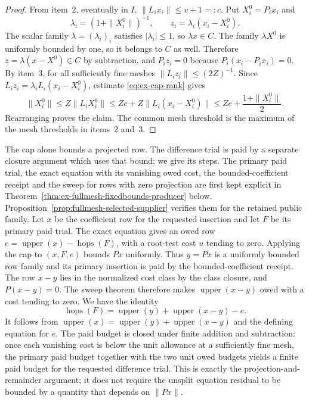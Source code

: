 \begin{proof}
From item~2, eventually in $I$, $\|L_i x_i\|\le v+1=:c$. Put
$X_i^0=P_i x_i$ and
\[
       \lambda_i=(1+\|X_i^0\|)^{-1},\qquad
       z_i=\lambda_i(x_i-X_i^0).
\]
The scalar family $\lambda=(\lambda_i)_i$ satisfies $|\lambda_i|\le1$, so
$\lambda x\in C$. The family $\lambda X^0$ is uniformly bounded by one, so
it belongs to $C$ as well. Therefore $z=\lambda(x-X^0)\in C$ by subtraction,
and $P_i z_i=0$ because
$P_i(x_i-P_ix_i)=0$. By item~3,
for all sufficiently fine meshes $\|L_i z_i\|\le(2Z)^{-1}$. Since
$L_i z_i=\lambda_i L_i(x_i-X_i^0)$, estimate \eqref{eq:ex-cap-rank} gives
\[
 \|X_i^0\|\le Z\|L_iX_i^0\|
 \le Zc+Z\|L_i(x_i-X_i^0)\|
 \le Zc+\frac{1+\|X_i^0\|}{2}.
\]
Rearranging proves the claim. The common mesh threshold is the maximum of the
mesh thresholds in items~2 and~3.
\end{proof}

The cap alone bounds a projected row. The difference trial is paid by a
separate closure argument which uses that bound; we give its steps. The
primary paid trial, the exact equation with its vanishing owed cost, the
bounded-coefficient receipt and the sweep for rows with zero projection are
first kept explicit in
Theorem~\ref{thm:ex-fullmesh-fixedbounds-producer} below.
Proposition~\ref{prop:fullmesh-selected-supplier} verifies them for the
retained public family. Let $x$ be
the coefficient row for the requested insertion and let $F$ be its primary
paid trial. The exact equation gives an owed row
$e=\operatorname{upper}(x)-\operatorname{hops}(F)$, with a root-test cost
$u$ tending to zero. Applying the cap to $(x,F,e)$ bounds $Px$ uniformly.
Thus $y=Px$ is a uniformly bounded row family and its primary insertion is
paid by the bounded-coefficient receipt. The row $x-y$ lies in the normalized
cost class by the class closure, and $P(x-y)=0$. The sweep theorem therefore
makes $\operatorname{upper}(x-y)$ owed with a cost tending to zero. We
have the identity
\[
  \operatorname{hops}(F)
   =\operatorname{upper}(y)+\operatorname{upper}(x-y)-e.
\]
It follows from $\operatorname{upper}(x)=\operatorname{upper}(y)+
\operatorname{upper}(x-y)$ and the defining equation for $e$. The paid
budget is closed under finite addition and subtraction: once each vanishing
cost is below the unit allowance at a sufficiently fine mesh, the primary
paid budget together with the two unit owed budgets yields a finite paid
budget for the requested difference trial. This is exactly the projection-and-remainder argument;
it does not require the unsplit equation residual to be bounded by a quantity
that depends on $\|Px\|$.

